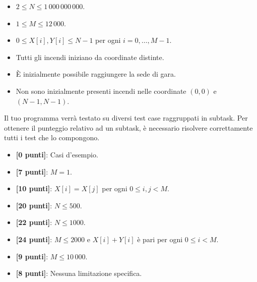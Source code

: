 \Constraints

\begin{itemize}[nolistsep, itemsep=2mm]
	\item $2 \le N \le 1\,000\,000\,000$.
	\item $1 \le M \le 12\,000$.
	\item $0 \le X[i], Y[i] \le N-1$ per ogni $i = 0, \ldots, M-1$.
	\item Tutti gli incendi iniziano da coordinate distinte.
	\item È inizialmente possibile raggiungere la sede di gara.
	\item Non sono inizialmente presenti incendi nelle coordinate $(0,0)$ e $(N-1, N-1)$.
\end{itemize}


\Scoring

Il tuo programma verrà testato su diversi test case raggruppati in subtask. Per
ottenere il punteggio relativo ad un subtask, è necessario risolvere
correttamente tutti i test che lo compongono.

\begin{itemize}[nolistsep,itemsep=2mm]
  \item \textbf{ [\phantom{1}0 punti]}: Casi d'esempio.
  \item \textbf{ [\phantom{1}7 punti]}: $M=1$.
  \item \textbf{ [10 punti]}: $X[i] = X[j]$ per ogni $0 \leq i, j < M$.
  \item \textbf{ [20 punti]}: $N \leq 500$.
  \item \textbf{ [22 punti]}: $N \leq 1000$.
  \item \textbf{ [24 punti]}: $M \leq 2000$ e $X[i] + Y[i]$ è pari per ogni $0 \leq i < M$.
  \item \textbf{ [\phantom{1}9 punti]}: $M \leq 10\,000$.
  \item \textbf{ [\phantom{1}8 punti]}: Nessuna limitazione specifica.
\end{itemize}


